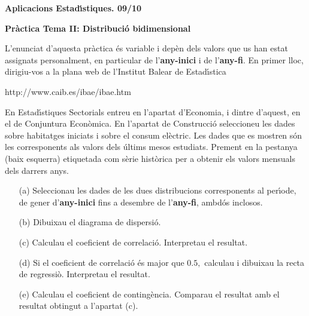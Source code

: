 \documentclass[11pt]{article}
\begin{document}
\begin{center}
\textbf{{\large{Aplicacions Estad\'{\i}stiques.  09/10}}}

\vspace{0.5cm}

\textbf{Pr\`actica Tema II: Distribuci\'o bidimensional}
\end{center} 

L'enunciat d'aquesta pr\`actica \'es variable i dep\`en dels valors que us han estat assignats personalment, en particular de l'\textbf{any-inici} i de l'\textbf{any-fi}. En primer lloc, dirigiu-vos a la plana web de l'Institut Balear de Estad\'{\i}stica 
\begin{center}
http://www.caib.es/ibae/ibae.htm
\end{center}
En Estad\'{\i}stiques Sectorials entreu en l'apartat d'Economia, i dintre d'aquest, en el de Conjuntura Econ\`omica. En l'apartat de Construcci\'o seleccioneu les dades sobre habitatges iniciats i sobre el consum el\`ectric. Les dades que es mostren s\'on les corresponents als valors dels \'ultims mesos estudiats. Prement en la pestanya (baix esquerra) etiquetada com s\`erie hist\`orica per a obtenir  els valors mensuals dels darrers anys.

\begin{itemize}
\item [(a)] Seleccionau les dades de les dues distribucions corresponents al per\'{\i}ode, de gener d'\textbf{any-inici} fins a desembre de l'\textbf{any-fi}, ambd\'os inclosos.
\item [(b)] Dibuixau el diagrama de dispersi\'o.
\item [(c)] Calculau el coeficient de correlaci\'o. Interpretau el resultat.
\item [(d)] Si el coeficient de correlaci\'o \'es major que $0.5,$ calculau i dibuixau la recta de regressi\`o. Interpretau el resultat.
\item [(e)] Calculau el coeficient de conting\`encia. Comparau el resultat amb el resultat obtingut a l'apartat (c).
\end{itemize}
\end{document}
